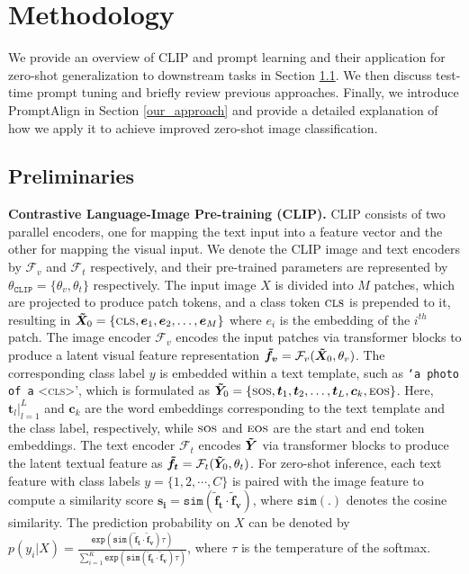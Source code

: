\documentclass[a4paper]{article}
\begin{document}
\section{Methodology}
\label{Methodology}
We provide an overview of CLIP \cite{radford2021learning} and prompt learning and their application for zero-shot generalization to downstream tasks in Section \ref{Preliminaries}. We then discuss test-time prompt tuning and briefly review previous approaches. Finally, we introduce PromptAlign in Section \ref{our_approach} and provide a detailed explanation of how we apply it to achieve improved zero-shot image classification. 

\subsection{Preliminaries}
\label{Preliminaries}
\noindent
\textbf{Contrastive Language-Image Pre-training (CLIP). }
CLIP consists of two parallel encoders, one for mapping the text input into a feature vector and the other for mapping the visual input. We denote the CLIP image and text encoders by $\mathcal{F}_v$ and $\mathcal{F}_t$ respectively, and their pre-trained parameters are represented by ${\theta}_{\mathtt{CLIP}} = \{\theta_{v}, \theta_{t} \}$ respectively. The input image ${X}$ is divided into $M$ patches, which are projected to produce patch tokens, and a class token ${\textsc{cls}}$ is prepended to it, resulting in $\bm{\Tilde{X}}_{0}= \{{\textsc{cls}}, \bm{e}_{1}, \bm{e}_{2}, \hdots, \bm{e}_{M}\}$ where $e_i$ is the embedding of the $i^{th}$ patch. The image encoder $\mathcal{F}_v$ encodes the input patches via transformer blocks to produce a latent visual feature representation $\bm{\Tilde{f}_v} =\mathcal{F}_v(\bm{\Tilde{X}}_{0}, \theta_{v})$. The corresponding class label ${y}$ is embedded within a text template, such as \texttt{`a photo of a} <{\textsc{cls}}>', which is formulated as $\bm{\Tilde{Y}}_{0}=\{{\textsc{sos}}, \bm{t}_{1}, \bm{t}_{2}, \hdots, \bm{t}_{L}, \bm{c}_{k}, {\textsc{eos}}\}$. Here, ${\bm{t}_l|_{l=1}^{L}}$ and $\bm{c}_{k}$ are the word embeddings corresponding to the text template and the class label, respectively, while ${\textsc{sos}}$ and ${\textsc{eos}}$ are the start and end token embeddings. The text encoder ${\mathcal{F}_t}$ encodes $\bm{\Tilde{Y}}$ via transformer blocks to produce the latent textual feature as $\bm{\Tilde{f}_t} = \mathcal{F}_{t}(\bm{\Tilde{Y}}_{0}, \theta_{t})$. For zero-shot inference, each text feature with class labels $y = \{1, 2, \cdots, C\}$ is paired with the image feature to compute a similarity score $\bm{s_i} = \mathtt{sim}(\bm{\tilde{f}_t} \cdot \bm{\tilde{f}_v})$, where $\mathtt{sim}(.)$ denotes the cosine similarity. The prediction probability on ${X}$ can be denoted by $ p(y_i|{X}) = \frac{\mathtt{exp}(\mathtt{sim}(\bm{\tilde{f}_t} \cdot \bm{\tilde{f}_v})\tau)}{\sum_{i=1}^{K}\mathtt{exp}(\mathtt{sim}(\bm{\tilde{f}_t} \cdot \bm{\tilde{f}_v})\tau)}$, where $\tau$ is the temperature of the softmax.%
 
\end{document}
